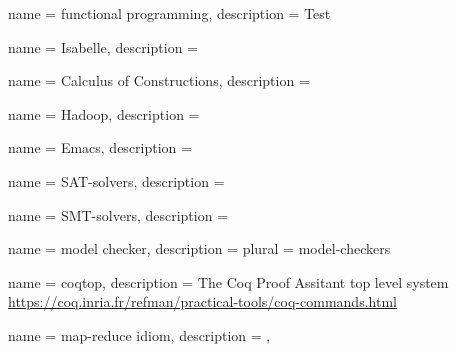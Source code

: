  
{name = functional programming,
description = {Test %
}}

{name = Isabelle,
description = {%
}}

{name = Calculus of Constructions,
description = {%
}}

{name = Hadoop,
description = {%
}}

{name = Emacs,
description = {%
}}

{name = SAT-solvers,
description = {%
}}

{name = SMT-solvers,
 description = {%
}}

{name = model checker,
description = {
}
plural = {model-checkers}
}

{
	name = coqtop, 
	description = {The Coq Proof Assitant top level system \url{https://coq.inria.fr/refman/practical-tools/coq-commands.html}
}}

{
 name = map-reduce idiom,
 description = {},
}







